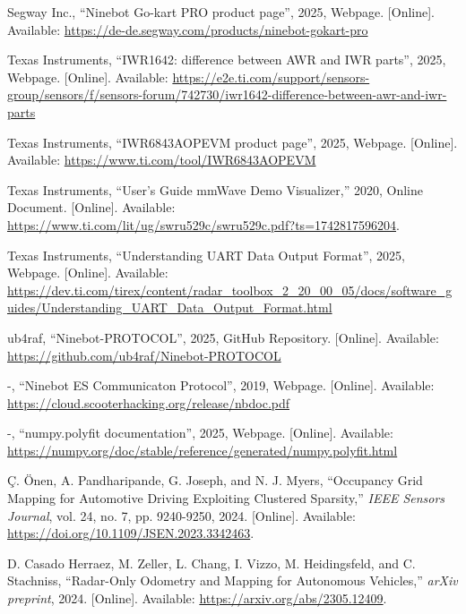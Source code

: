 \newpage

\begin{thebibliography}{00}

 Segway Inc., ``Ninebot Go-kart PRO product page'', 2025, Webpage. [Online]. Available: \url{https://de-de.segway.com/products/ninebot-gokart-pro}

 Texas Instruments, ``IWR1642: difference between AWR and IWR parts'', 2025, Webpage. [Online]. Available: \url{https://e2e.ti.com/support/sensors-group/sensors/f/sensors-forum/742730/iwr1642-difference-between-awr-and-iwr-parts}

 Texas Instruments, ``IWR6843AOPEVM product page'', 2025, Webpage. [Online]. Available: \url{https://www.ti.com/tool/IWR6843AOPEVM}

 Texas Instruments, ``User's Guide mmWave Demo Visualizer,'' 2020, Online Document. [Online]. Available: \url{https://www.ti.com/lit/ug/swru529c/swru529c.pdf?ts=1742817596204}.

 Texas Instruments, ``Understanding UART Data Output Format'', 2025, Webpage. [Online]. Available: \url{https://dev.ti.com/tirex/content/radar_toolbox_2_20_00_05/docs/software_guides/Understanding_UART_Data_Output_Format.html}

 ub4raf, ``Ninebot-PROTOCOL'', 2025, GitHub Repository. [Online]. Available: \url{https://github.com/ub4raf/Ninebot-PROTOCOL}

 -, ``Ninebot ES Communicaton Protocol'', 2019, Webpage. [Online]. Available: \url{https://cloud.scooterhacking.org/release/nbdoc.pdf}

 -, ``numpy.polyfit documentation'', 2025, Webpage. [Online]. Available: \url{https://numpy.org/doc/stable/reference/generated/numpy.polyfit.html}

 Ç. Önen, A. Pandharipande, G. Joseph, and N. J. Myers, ``Occupancy Grid Mapping for Automotive Driving Exploiting Clustered Sparsity,'' \textit{IEEE Sensors Journal}, vol. 24, no. 7, pp. 9240-9250, 2024. [Online]. Available: \url{https://doi.org/10.1109/JSEN.2023.3342463}.

 D. Casado Herraez, M. Zeller, L. Chang, I. Vizzo, M. Heidingsfeld, and C. Stachniss, ``Radar-Only Odometry and Mapping for Autonomous Vehicles,'' \textit{arXiv preprint}, 2024. [Online]. Available: \url{https://arxiv.org/abs/2305.12409}.


\end{thebibliography}
